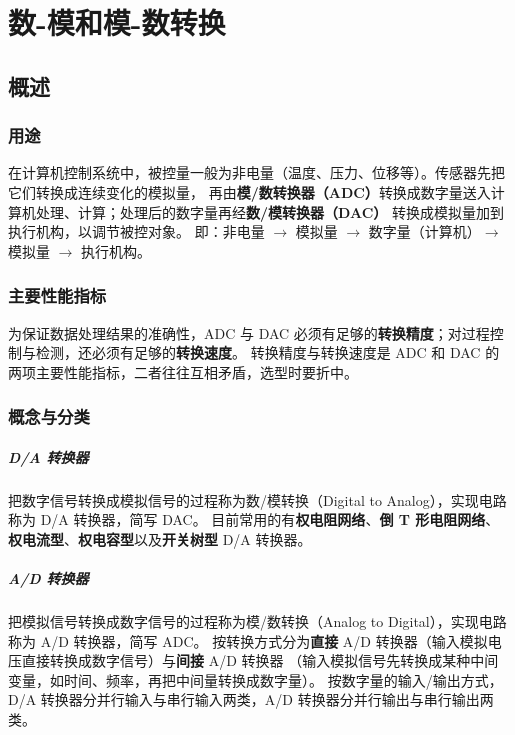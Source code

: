 \setlength{\parskip}{0.4em}
\setlength{\itemsep}{0.2em}
\setlength{\tabcolsep}{4pt}

\chapter{数-模和模-数转换}
\section{概述}
\subsection{用途}
在计算机控制系统中，被控量一般为非电量（温度、压力、位移等）。传感器先把它们转换成连续变化的模拟量，
再由\textbf{模/数转换器（ADC）}转换成数字量送入计算机处理、计算；处理后的数字量再经\textbf{数/模转换器（DAC）}
转换成模拟量加到执行机构，以调节被控对象。
即：非电量 $\rightarrow$ 模拟量 $\rightarrow$ 数字量（计算机）$\rightarrow$ 模拟量 $\rightarrow$ 执行机构。

\subsection{主要性能指标}
为保证数据处理结果的准确性，ADC 与 DAC 必须有足够的\textbf{转换精度}；对过程控制与检测，还必须有足够的\textbf{转换速度}。
转换精度与转换速度是 ADC 和 DAC 的两项主要性能指标，二者往往互相矛盾，选型时要折中。

\subsection{概念与分类}
\paragraph{D/A 转换器}
把数字信号转换成模拟信号的过程称为数/模转换（Digital to Analog），实现电路称为 D/A 转换器，简写 DAC。
目前常用的有\textbf{权电阻网络}、\textbf{倒 T 形电阻网络}、\textbf{权电流型}、\textbf{权电容型}以及\textbf{开关树型} D/A 转换器。
\paragraph{A/D 转换器}
把模拟信号转换成数字信号的过程称为模/数转换（Analog to Digital），实现电路称为 A/D 转换器，简写 ADC。
按转换方式分为\textbf{直接} A/D 转换器（输入模拟电压直接转换成数字信号）与\textbf{间接} A/D 转换器
（输入模拟信号先转换成某种中间变量，如时间、频率，再把中间量转换成数字量）。
按数字量的输入/输出方式，D/A 转换器分并行输入与串行输入两类，A/D 转换器分并行输出与串行输出两类。

